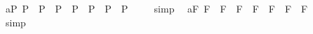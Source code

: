 \begin{isabellebody}
\ a{}{}{\isacharunderscore}{}{\isacharunderscore}P{\isacharcolon}\ {\isachardoublequoteopen}{\isacharbrackleft}{\isacharparenleft}{\isacharparenleft}{\isasymphi}\isactrlsup P{\isacharparenright}\ \isactrlbold {\isasymrightarrow}\ {\isacharparenleft}{\isacharparenleft}{\isasympsi}\isactrlsup P{\isacharparenright}\ \isactrlbold {\isasymrightarrow}\ {\isacharparenleft}{\isasymchi}\isactrlsup P{\isacharparenright}{\isacharparenright}{\isacharparenright}\ \isactrlbold {\isasymrightarrow}\ {\isacharparenleft}{\isacharparenleft}{\isacharparenleft}{\isasymphi}\isactrlsup P{\isacharparenright}\ \isactrlbold {\isasymrightarrow}\ {\isacharparenleft}{\isasympsi}\isactrlsup P{\isacharparenright}{\isacharparenright}\ \isactrlbold {\isasymrightarrow}\ {\isacharparenleft}{\isacharparenleft}{\isasymphi}\isactrlsup P{\isacharparenright}\ \isactrlbold {\isasymrightarrow}\ {\isacharparenleft}{\isasymchi}\isactrlsup P{\isacharparenright}{\isacharparenright}{\isacharparenright}{\isacharbrackright}\ {\isacharequal}\ {\isasymtop}{\isachardoublequoteclose}%
\isadelimproof
\ %
\endisadelimproof
%
\isatagproof
{}\isamarkupfalse%
\ simp\ \isamarkupfalse%
%
\endisatagproof
{\isafoldproof}%
%
\isadelimproof
%
\endisadelimproof
\isanewline
{}\isamarkupfalse%
\ a{}{}{\isacharunderscore}{}{\isacharunderscore}F{\isacharcolon}\ {\isachardoublequoteopen}{\isacharbrackleft}{\isacharparenleft}{\isacharparenleft}{\isasymphi}\isactrlsup F{\isacharparenright}\ \isactrlbold {\isasymrightarrow}\ {\isacharparenleft}{\isacharparenleft}{\isasympsi}\isactrlsup F{\isacharparenright}\ \isactrlbold {\isasymrightarrow}\ {\isacharparenleft}{\isasymchi}\isactrlsup F{\isacharparenright}{\isacharparenright}{\isacharparenright}\ \isactrlbold {\isasymrightarrow}\ {\isacharparenleft}{\isacharparenleft}{\isacharparenleft}{\isasymphi}\isactrlsup F{\isacharparenright}\ \isactrlbold {\isasymrightarrow}\ {\isacharparenleft}{\isasympsi}\isactrlsup F{\isacharparenright}{\isacharparenright}\ \isactrlbold {\isasymrightarrow}\ {\isacharparenleft}{\isacharparenleft}{\isasymphi}\isactrlsup F{\isacharparenright}\ \isactrlbold {\isasymrightarrow}\ {\isacharparenleft}{\isasymchi}\isactrlsup F{\isacharparenright}{\isacharparenright}{\isacharparenright}{\isacharbrackright}\ {\isacharequal}\ {\isasymtop}{\isachardoublequoteclose}%
\isadelimproof
\ %
\endisadelimproof
%
\isatagproof
{}\isamarkupfalse%
\ simp\ \isamarkupfalse%
%
\endisatagproof
{\isafoldproof}%
%
\isadelimproof
%

\end{isabellebody}
